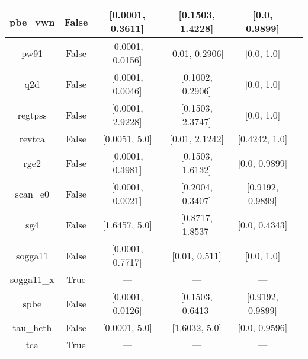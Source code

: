 \begin{tabular}{|c|c|c|c|c|l|}
      pbe\_vwn &                 False & [0.0001, 0.3611] & [0.1503, 1.4228] &    [0.0, 0.9899] & \cite{Kraisler2010_042516,Perdew1996_3865,Perdew1996_3865_err} \\ \hline
          pw91 &                 False & [0.0001, 0.0156] &   [0.01, 0.2906] &       [0.0, 1.0] &          \cite{Perdew1991,Perdew1992_6671,Perdew1992_6671_err} \\ \hline
           q2d &                 False & [0.0001, 0.0046] & [0.1002, 0.2906] &       [0.0, 1.0] &                                       \cite{Chiodo2012_126402} \\ \hline
       regtpss &                 False & [0.0001, 2.9228] & [0.1503, 2.3747] &       [0.0, 1.0] &                                       \cite{Perdew2009_026403} \\ \hline
        revtca &                 False &    [0.0051, 5.0] &   [0.01, 2.1242] &    [0.4242, 1.0] &                                        \cite{Tognetti2008_536} \\ \hline
          rge2 &                 False & [0.0001, 0.3981] & [0.1503, 1.6132] &    [0.0, 0.9899] &                                      \cite{Ruzsinszky2009_763} \\ \hline
      scan\_e0 &                 False & [0.0001, 0.0021] & [0.2004, 0.3407] & [0.9192, 0.9899] &                                          \cite{Sun2015_036402} \\ \hline
           sg4 &                 False &    [1.6457, 5.0] & [0.8717, 1.8537] &    [0.0, 0.4343] &                                   \cite{Constantin2016_045126} \\ \hline
       sogga11 &                 False & [0.0001, 0.7717] &    [0.01, 0.511] &       [0.0, 1.0] &                                       \cite{Peverati2011_1991} \\ \hline
    sogga11\_x &                  True &              --- &              --- &              --- &                                     \cite{Peverati2011_191102} \\ \hline
          spbe &                 False & [0.0001, 0.0126] & [0.1503, 0.6413] & [0.9192, 0.9899] &                                        \cite{Swart2009_094103} \\ \hline
     tau\_hcth &                 False &    [0.0001, 5.0] &    [1.6032, 5.0] &    [0.0, 0.9596] &                                          \cite{Boese2002_9559} \\ \hline
           tca &                  True &              --- &              --- &              --- &                                     \cite{Tognetti2008_034101} \\ \hline

\end{tabular}
